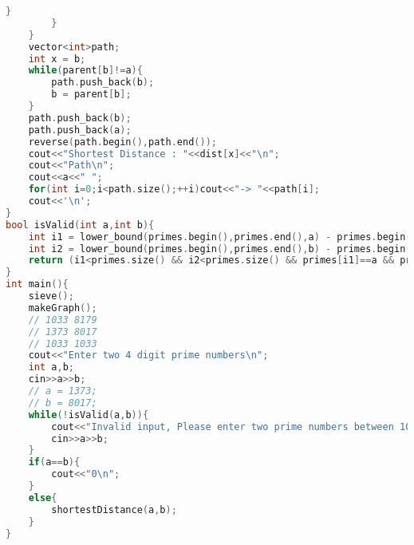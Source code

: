 \documentclass[conference]{IEEEtran}
\begin{document}
\begin{titlepage}
\begin{lstlisting}[language=C++,caption=Code for this paper]
            }
        }
    }
    vector<int>path;
    int x = b;
    while(parent[b]!=a){
        path.push_back(b);
        b = parent[b];
    }
    path.push_back(b);
    path.push_back(a);
    reverse(path.begin(),path.end());
    cout<<"Shortest Distance : "<<dist[x]<<"\n";
    cout<<"Path\n";
    cout<<a<<" ";
    for(int i=0;i<path.size();++i)cout<<"-> "<<path[i];
    cout<<'\n';
}
bool isValid(int a,int b){
    int i1 = lower_bound(primes.begin(),primes.end(),a) - primes.begin();
    int i2 = lower_bound(primes.begin(),primes.end(),b) - primes.begin();
    return (i1<primes.size() && i2<primes.size() && primes[i1]==a && primes[i2]==b);
}
int main(){
    sieve();
    makeGraph();
    // 1033 8179
    // 1373 8017
    // 1033 1033
    cout<<"Enter two 4 digit prime numbers\n";
    int a,b;
    cin>>a>>b;
    // a = 1373;
    // b = 8017;
    while(!isValid(a,b)){
        cout<<"Invalid input, Please enter two prime numbers between 1000 and 9999 (ex. 1373 8017)\n";
        cin>>a>>b;
    }
    if(a==b){
        cout<<"0\n";
    }
    else{
        shortestDistance(a,b);
    }
}
\end{lstlisting}
\end{titlepage}
\end{document}
